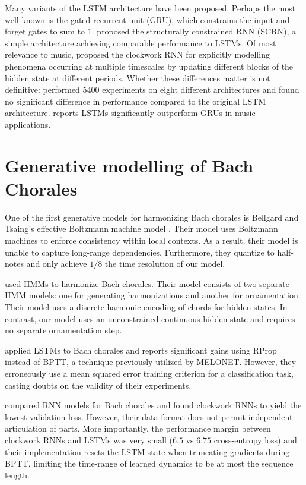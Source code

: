 Many variants of the LSTM architecture have been proposed. Perhaps the most
well known is the gated recurrent unit (GRU)\citep{cho2014learning}, which
constrains the input and forget gates to sum to $1$. \citep{Mikolov2015}
proposed the structurally constrained RNN (SCRN), a simple architecture
achieving comparable performance to LSTMs. Of most relevance to music,
\citep{Koutnik2014} proposed the clockwork RNN for explicitly modelling phenomena
occurring at multiple timescales by updating different blocks of the hidden
state at different periods. Whether these differences matter is not definitive:
\citep{greff2015lstm} performed 5400 experiments on eight different
architectures and found no significant difference in performance compared to
the original LSTM architecture. \citep{Nayebi2015} reports LSTMs significantly
outperform GRUs in music applications.

\section{Generative modelling of Bach Chorales}

One of the first generative models for harmonizing Bach chorales is Bellgard
and Tsaing's effective Boltzmann machine model \citep{bellgard1994harmonizing}. Their model
uses Boltzmann machines to enforce consistency within local contexts. As a result,
their model is unable to capture long-range dependencies. Furthermore, they quantize
to half-notes and only achieve $1/8$ the time resolution of our model.

\citep{Allan2005} used HMMs to harmonize Bach chorales. Their model consists of
two separate HMM models: one for generating harmonizations and another for
ornamentation. Their model uses a discrete harmonic encoding of chords for
hidden states. In contrast, our model uses an unconstrained continuous hidden
state and requires no separate ornamentation step.

\citep{Liu2014} applied LSTMs to Bach chorales and reports significant gains
using RProp instead of BPTT, a technique previously utilized by
MELONET\citep{feulner1994melonet}. However, they erroneously use a mean squared
error training criterion for a classification task, casting doubts on the
validity of their experiments.

\citep{Brien2016} compared RNN models for Bach chorales and found clockwork RNNs to
yield the lowest validation loss. However, their data format does not permit
independent articulation of parts. More importantly, the performance margin between
clockwork RNNs and LSTMs was very small ($6.5$ vs $6.75$ cross-entropy loss) and their
implementation resets the LSTM state when truncating gradients during BPTT, limiting the
time-range of learned dynamics to be at most the sequence length.

